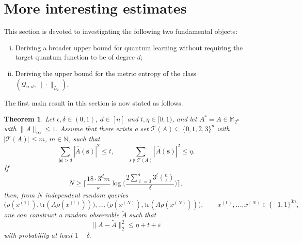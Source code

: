 \documentclass{amsbook}
\newtheorem{theorem}{Theorem}[chapter]
\theoremstyle{definition}
\theoremstyle{remark}
\numberwithin{section}{chapter}
\numberwithin{equation}{chapter}
\newcommand{\M}{\mathbb{M}}
\newcommand{\1}{\mathbf{1}}
\newcommand{\s}{\mathbf{s}}
\begin{document}
\section{More interesting estimates}
This section is devoted to investigating the following two fundamental objects:
\begin{enumerate}[(i)]
\item Deriving a broader upper bound for quantum learning without requiring the target quantum function to be of degree $d$;
\item Deriving the upper bound  for the metric entropy of the class $(\mathcal Q_{n,d}, \|\cdot\|_{L_2})$.
\end{enumerate}
The first main result in this section is now stated as follows.
\begin{theorem}\label{low-lea-thm2}
Let $\epsilon,\delta\in (0,1)$, \(d\in[n]\) and \(t,\eta\in[0,1)\), and let $A^*=A\in \M_{2^n}$  with  $\|A\|_\infty\le 1$. Assume that there exists a set
	$\mathcal T(A)\subseteq\{0,1,2,3\}^n$ with $|\mathcal{T}(A)|\le m$, $m\in\mathbb{N}$, such that
	\[
	\sum_{|\s|>d}|\widehat A(\s)|^2\le t,
	\qquad
	\sum_{s\notin \mathcal T(A)}|\widehat A(\s)|^2\le \eta.
	\]
If
	\[
	N\ge 	\Big\lceil
	\frac{18\cdot 3^dm}{\varepsilon}
	\log \Big(\frac{2\sum_{\ell=0}^d 3^\ell\binom{n}{\ell}}{\delta}\Big)
	\Big\rceil,
	\]
then, from $N$ independent random queries
	\[
	\bigl(\rho(x^{(1)}),\mathrm{tr}(A\rho(x^{(1)}))\bigr),\dots,
	\bigl(\rho(x^{(N)}),\mathrm{tr}(A\rho(x^{(N)}))\bigr),
	\qquad x^{(1)},\dots,x^{(N)} \in \{-1,1\}^{3n},
	\]
	one can construct a random observable $\widetilde A$ such that
	\[
	\|A-\widetilde A\|_2^2\le \eta+t+\varepsilon
	\]
	with probability at least $1-\delta$.
\end{theorem}
\end{document}
